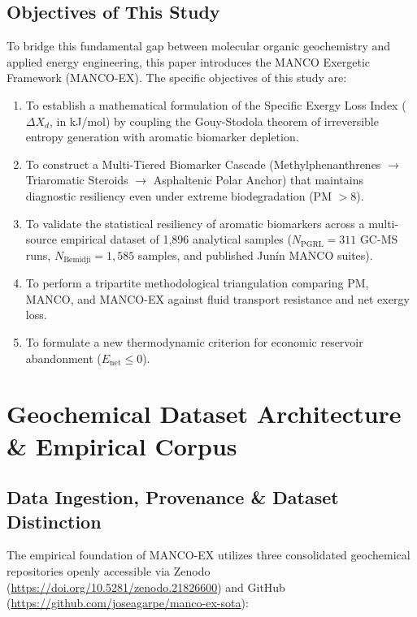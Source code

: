 \documentclass[review,12pt]{elsarticle}
\begin{document}
\subsection{Objectives of This Study}
To bridge this fundamental gap between molecular organic geochemistry and applied energy engineering, this paper introduces the MANCO Exergetic Framework (MANCO-EX). The specific objectives of this study are:
\begin{enumerate}
    \item To establish a mathematical formulation of the Specific Exergy Loss Index ($\Delta X_d$, in kJ/mol) by coupling the Gouy-Stodola theorem of irreversible entropy generation with aromatic biomarker depletion.
    \item To construct a Multi-Tiered Biomarker Cascade (Methylphenanthrenes $\rightarrow$ Triaromatic Steroids $\rightarrow$ Asphaltenic Polar Anchor) that maintains diagnostic resiliency even under extreme biodegradation (PM $> 8$).
    \item To validate the statistical resiliency of aromatic biomarkers across a multi-source empirical dataset of 1,896 analytical samples ($N_{\text{PGRL}} = 311$ GC-MS runs, $N_{\text{Bemidji}} = 1,585$ samples, and published Junín MANCO suites).
    \item To perform a tripartite methodological triangulation comparing PM, MANCO, and MANCO-EX against fluid transport resistance and net exergy loss.
    \item To formulate a new thermodynamic criterion for economic reservoir abandonment ($E_{\text{net}} \le 0$).
\end{enumerate}

\section{Geochemical Dataset Architecture \& Empirical Corpus}

\subsection{Data Ingestion, Provenance \& Dataset Distinction}
The empirical foundation of MANCO-EX utilizes three consolidated geochemical repositories openly accessible via Zenodo (\url{https://doi.org/10.5281/zenodo.21826600}) and GitHub (\url{https://github.com/joseagarpe/manco-ex-sota}):
\end{document}
